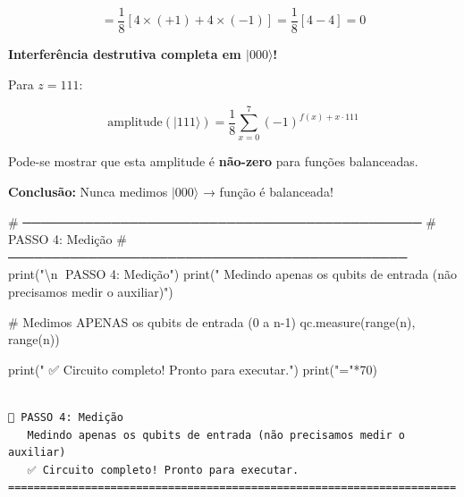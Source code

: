 \documentclass[
  brazilian,
]{report}
\newenvironment{Shaded}{\begin{snugshade}}{\end{snugshade}}
\newcommand{\NormalTok}[1]{\textcolor[rgb]{0.00,0.23,0.31}{#1}}
\begin{document}
\[= \frac{1}{8}[4 \times (+1) + 4 \times (-1)] = \frac{1}{8}[4 - 4] = 0\]

\textbf{Interferência destrutiva completa em \(|000\rangle\)!}

Para \(z = 111\):

\[\text{amplitude}(|111\rangle) = \frac{1}{8} \sum_{x=0}^{7} (-1)^{f(x) + x \cdot 111}\]

Pode-se mostrar que esta amplitude é \textbf{não-zero} para funções
balanceadas.

\textbf{Conclusão:} Nunca medimos \(|000\rangle\) → função é balanceada!

\begin{Shaded}
\begin{Highlighting}[]


\NormalTok{\# ─────────────────────────────────────────────}
\NormalTok{\# PASSO 4: Medição}
\NormalTok{\# ─────────────────────────────────────────────}
\NormalTok{print("\textbackslash{}n📍 PASSO 4: Medição")}
\NormalTok{print("   Medindo apenas os qubits de entrada (não precisamos medir o auxiliar)")}

\NormalTok{\# Medimos APENAS os qubits de entrada (0 a n{-}1)}
\NormalTok{qc.measure(range(n), range(n))}

\NormalTok{print("   ✅ Circuito completo! Pronto para executar.")}
\NormalTok{print("="*70)}
\end{Highlighting}
\end{Shaded}

\begin{verbatim}

📍 PASSO 4: Medição
   Medindo apenas os qubits de entrada (não precisamos medir o auxiliar)
   ✅ Circuito completo! Pronto para executar.
======================================================================
\end{verbatim}
\end{document}
